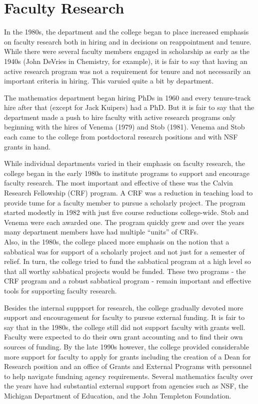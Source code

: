 \documentclass[
]{book}
\begin{document}
\hypertarget{faculty-research}{%
\section{Faculty Research}\label{faculty-research}}

In the 1980s, the department and the college began to place increased emphasis on faculty research both in hiring and in decisions on reappointment and tenure. While there were several faculty members engaged in scholarship as early as the 1940s (John DeVries in Chemistry, for example), it is fair to say that having an active research program was not a requirement for tenure and not necessarily an important criteria in hiring. This varuied quite a bit by department.

The mathematics department began hiring PhDs in 1960 and every tenure-track hire after that (except for Jack Kuipers) had a PhD. But it is fair to say that the department made a push to hire faculty with active research programs only beginning with the hires of Venema (1979) and Stob (1981). Venema and Stob each came to the college from postdoctoral research positions and with NSF grants in hand.

While individual departments varied in their emphasis on faculty research, the college began in the early 1980s to institute programs to support and encourage faculty research. The most important and effective of these was the Calvin Research Fellowship (CRF) program. A CRF was a reduction in teaching load to provide tume for a faculty member to pursue a scholarly project. The program started modestly in 1982 with just five course reductions college-wide. Stob and Venema were each awarded one. The program quickly grew and over the years many department members have had multiple ``units'' of CRFs.\\
Also, in the 1980s, the college placed more emphasis on the notion that a sabbatical was for support of a scholarly project and not just for a semester of relief. In turn, the college tried to fund the sabbatical program at a high level so that all worthy sabbatical projects would be funded. These two programs - the CRF program and a robust sabbatical program - remain important and effective tools for supporting faculty research.

Besides the internal suppport for research, the college gradually devoted more support and encouragement for faculty to pursue external funding. It is fair to say that in the 1980s, the college still did not support faculty with grants well. Faculty were expected to do their own grant accounting and to find their own sources of funding. By the late 1990s however, the college provided considerable more support for faculty to apply for grants including the creation of a Dean for Research position and an office of Grants and External Programs with personnel to help navigate fundning agency requirements. Several mathematics faculty over the years have had substantial external support from agencies such as NSF, the Michigan Department of Education, and the John Templeton Foundation.
\end{document}
